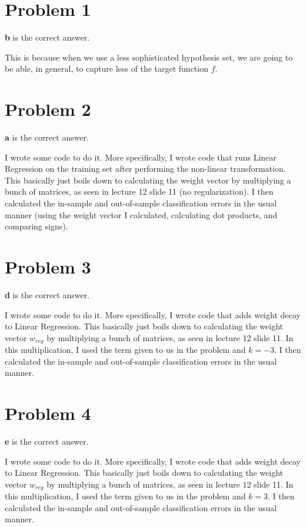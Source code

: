 \documentclass{article}
\begin{document}
\section*{Problem 1}
\textbf{b} is the correct answer.

\noindent This is because when we use a less sophisticated hypothesis set,
we are going to be able, in general, to capture less of the target function
$f$.

\section*{Problem 2}
\textbf{a} is the correct answer.

\noindent I wrote some code to do it. More specifically, I wrote code
that runs Linear Regression on the training set after performing the non-linear
transformation. This basically just boils down to calculating the weight vector
by multiplying a bunch of matrices, as seen in lecture 12 slide 11 (no
regularization).
I then calculated the in-sample and out-of-sample classification
errors in the usual manner (using the weight vector I calculated, calculating
dot products, and comparing signs).

\section*{Problem 3}
\textbf{d} is the correct answer.

\noindent I wrote some code to do it. More specifically, I wrote code that
adds weight decay to Linear Regression. This basically just boils down to
calculating the weight vector $w_{reg}$ by multiplying a bunch of matrices,
as seen in lecture 12 slide 11. In this multiplication, I used the term
given to us in the problem and $k=-3$. I then calculated the in-sample and
out-of-sample classification errors in the usual manner.

\section*{Problem 4}
\textbf{e} is the correct answer.

\noindent I wrote some code to do it. More specifically, I wrote code that
adds weight decay to Linear Regression. This basically just boils down to
calculating the weight vector $w_{reg}$ by multiplying a bunch of matrices,
as seen in lecture 12 slide 11. In this multiplication, I used the term
given to us in the problem and $k=3$. I then calculated the in-sample and
out-of-sample classification errors in the usual manner.
\end{document}
